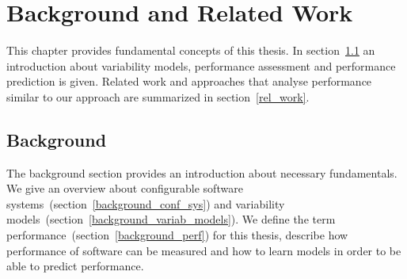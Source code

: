 \chapter{Background and Related Work}
\label{b_rel_work}

This chapter provides fundamental concepts of this thesis. 
In section~\ref{background} an introduction about variability models, performance assessment and performance prediction is given. 
Related work and approaches that analyse performance similar to our approach are summarized in section~\ref{rel_work}.

\section{Background}
\label{background}

The background section provides an introduction about necessary fundamentals. 
We give an overview about configurable software systems~(section~\ref{background_conf_sys}) and variability models~(section~\ref{background_variab_models}). 
We define the term performance~(section~\ref{background_perf}) for this thesis, describe how performance of software can be measured and how to learn models in order to be able to predict performance.

